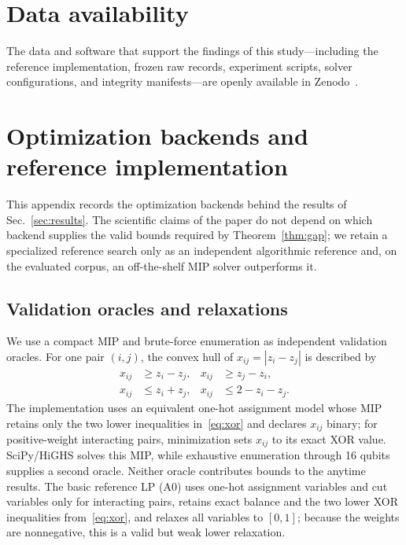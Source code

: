 \documentclass[
  aps,
  pra,
  reprint,
  amsmath,
  amssymb,
  longbibliography,
  nofootinbib,
  floatfix
]{revtex4-2}
\theoremstyle{plain}
\begin{document}
\section*{Data availability}
The data and software that support the findings of this study---including the reference implementation, frozen raw records, experiment scripts, solver configurations, and integrity manifests---are openly available in Zenodo~\cite{certicut_zenodo}.

\appendix

\section{Optimization backends and reference implementation}
\label{app:backend}

This appendix records the optimization backends behind the results of Sec.~\ref{sec:results}. The scientific claims of the paper do not depend on which backend supplies the valid bounds required by Theorem~\ref{thm:gap}; we retain a specialized reference search only as an independent algorithmic reference and, on the evaluated corpus, an off-the-shelf MIP solver outperforms it.

\subsection{Validation oracles and relaxations}

We use a compact MIP and brute-force enumeration as independent validation oracles. For one pair $(i,j)$, the convex hull of $x_{ij}=|z_i-z_j|$ is described by
\begin{equation}
\begin{aligned}
  x_{ij} &\geq z_i-z_j, & x_{ij} &\geq z_j-z_i,\\
  x_{ij} &\leq z_i+z_j, & x_{ij} &\leq 2-z_i-z_j.
\end{aligned}
  \label{eq:xor}
\end{equation}
The implementation uses an equivalent one-hot assignment model whose MIP retains only the two lower inequalities in~\eqref{eq:xor} and declares $x_{ij}$ binary; for positive-weight interacting pairs, minimization sets $x_{ij}$ to its exact XOR value. SciPy/HiGHS solves this MIP, while exhaustive enumeration through 16 qubits supplies a second oracle. Neither oracle contributes bounds to the anytime results. The basic reference LP (A0) uses one-hot assignment variables and cut variables only for interacting pairs, retains exact balance and the two lower XOR inequalities from~\eqref{eq:xor}, and relaxes all variables to $[0,1]$; because the weights are nonnegative, this is a valid but weak lower relaxation.
\end{document}
